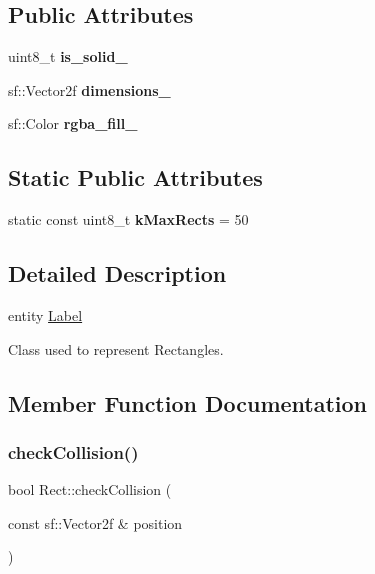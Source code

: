 \subsection*{Public Attributes}
\begin{DoxyCompactItemize}
\item 
\mbox{\label{class_rect_a898ebf0731c53c824582d4b1930b9e90}} 
uint8\+\_\+t {\bfseries is\+\_\+solid\+\_\+}
\item 
\mbox{\label{class_rect_abb92a0e14f750712887e2061866a52bd}} 
sf\+::\+Vector2f {\bfseries dimensions\+\_\+}
\item 
\mbox{\label{class_rect_a6af011eb6f16dabee8eff47e0772260e}} 
sf\+::\+Color {\bfseries rgba\+\_\+fill\+\_\+}
\end{DoxyCompactItemize}
\subsection*{Static Public Attributes}
\begin{DoxyCompactItemize}
\item 
\mbox{\label{class_rect_a18981822ae235d9ed80b6dd9ba257fcc}} 
static const uint8\+\_\+t {\bfseries k\+Max\+Rects} = 50
\end{DoxyCompactItemize}


\subsection{Detailed Description}
entity \hyperlink{class_label}{Label}

Class used to represent Rectangles. 

\subsection{Member Function Documentation}
\mbox{\label{class_rect_afb4fd23ac0ebf55ef7d9c1bcdcc7ff30}} 
\subsubsection{\texorpdfstring{check\+Collision()}{checkCollision()}}
{\footnotesize\ttfamily bool Rect\+::check\+Collision (\begin{DoxyParamCaption}\item[{const sf\+::\+Vector2f \&}]{position }\end{DoxyParamCaption})}

